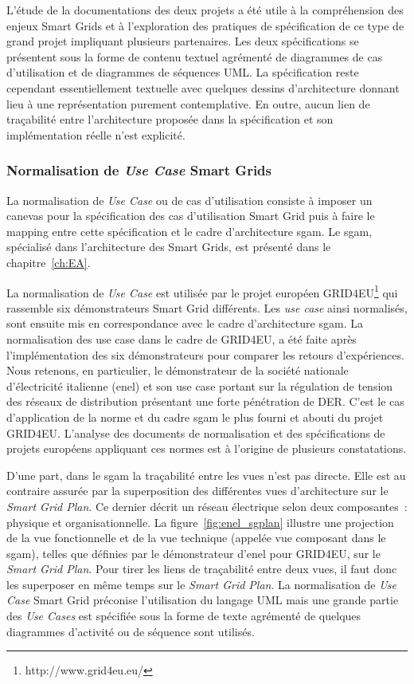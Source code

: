 L'étude de la documentations des deux projets a été utile à la compréhension des
enjeux Smart Grids et à l'exploration des pratiques de spécification de ce type
de grand projet impliquant plusieurs partenaires. Les deux spécifications se
présentent sous la forme de contenu textuel agrémenté de diagrammes de cas
d'utilisation et de diagrammes de séquences UML. La spécification reste
cependant essentiellement textuelle avec quelques dessins d'architecture donnant
lieu à une représentation purement contemplative. En outre, aucun lien de
traçabilité entre l'architecture proposée dans la spécification et son
implémentation réelle n'est explicité.

\subsubsection{Normalisation de \textit{Use Case} Smart Grids}
\label{sec:ENEL}

La normalisation de \textit{Use Case} ou de cas d'utilisation consiste à
imposer un canevas pour la spécification des cas d'utilisation Smart Grid puis à
faire le mapping entre cette spécification et le cadre d'architecture
\gls{sgam}. Le \gls{sgam}, spécialisé dans l'architecture des Smart Grids, est
présenté dans le chapitre~\ref{ch:EA}.

La normalisation de \textit{Use Case} est utilisée par le projet européen
GRID4EU\footnote{http://www.grid4eu.eu/} qui rassemble six démonstrateurs Smart
Grid différents. Les \textit{use case} ainsi normalisés, sont ensuite mis en
correspondance avec le cadre d'architecture \gls{sgam}. La normalisation des use
case dans le cadre de GRID4EU, a été faite après l'implémentation des six
démonstrateurs pour comparer les retours d'expériences. Nous retenons, en
particulier, le démonstrateur de la société nationale d'électricité italienne
(\gls{enel}) et son use case portant sur la régulation de tension des réseaux de
distribution présentant une forte pénétration de DER. C'est le cas d'application
de la norme et du cadre \gls{sgam} le plus fourni et abouti du projet GRID4EU.
L'analyse des documents de normalisation et des spécifications de projets
européens appliquant ces normes est à l'origine de plusieurs constatations.

D'une part, dans le \gls{sgam} la traçabilité entre les vues n'est pas directe.
Elle est au contraire assurée par la superposition des différentes vues
d'architecture sur le \textit{Smart Grid Plan}. Ce dernier décrit un réseau
électrique selon deux composantes~: physique et organisationnelle. La
figure~\ref{fig:enel_sgplan} illustre une projection de la vue fonctionnelle et
de la vue technique (appelée vue composant dans le \gls{sgam}), telles que
définies par le démonstrateur d'\gls{enel} pour GRID4EU, sur le \textit{Smart
Grid Plan}. Pour tirer les liens de traçabilité entre deux vues, il faut donc
les superposer en même temps sur le \textit{Smart Grid Plan}. La normalisation
de \textit{Use Case} Smart Grid préconise l'utilisation du langage UML mais une
grande partie des \textit{Use Cases} est spécifiée sous la forme de texte
agrémenté de quelques diagrammes d'activité ou de séquence sont utilisés.

